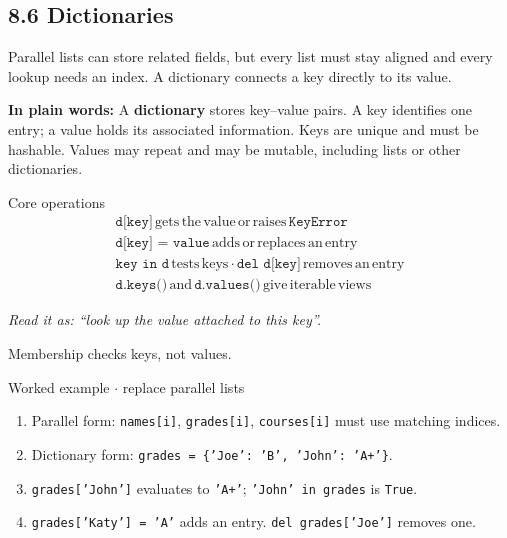 \documentclass[11pt]{article}
\begin{document}
\begin{keepsection}
\section{8.6 Dictionaries}

Parallel lists can store related fields, but every list must stay aligned and every lookup needs an index. A dictionary connects a key directly to its value.

\begin{plainbox}\textbf{In plain words:} A \textbf{dictionary} stores key–value pairs. A key identifies one entry; a value holds its associated information. Keys are unique and must be hashable. Values may repeat and may be mutable, including lists or other dictionaries.\end{plainbox}

\begin{equationcard}{Core operations}
\[ \begin{gathered} \texttt{d[key]}\, \text{gets}\, \text{the}\, \text{value}\, \text{or}\, \text{raises}\, \texttt{KeyError} \\ \texttt{d[key] = value}\, \text{adds}\, \text{or}\, \text{replaces}\, \text{an}\, \text{entry} \\ \texttt{key in d}\, \text{tests}\, \text{keys}\, \cdot \, \texttt{del d[key]}\, \text{removes}\, \text{an}\, \text{entry} \\ \texttt{d.keys()}\, \text{and}\, \texttt{d.values()}\, \text{give}\, \text{iterable}\, \text{views} \end{gathered} \]
{\small \emph{Read it as: “look up the value attached to this key”.}\par  Membership checks keys, not values.}
\end{equationcard}

\begin{workedbox}{Worked example \ensuremath{\cdot} replace parallel lists}
\begin{enumerate}
\item Parallel form: \texttt{names[i]}, \texttt{grades[i]}, \texttt{courses[i]} must use matching indices.
\item Dictionary form: \texttt{grades = \{'Joe': 'B', 'John': 'A+'\}}.
\item \texttt{grades['John']} evaluates to \texttt{'A+'}; \texttt{'John' in grades} is \texttt{True}.
\item \texttt{grades['Katy'] = 'A'} adds an entry. \texttt{del grades['Joe']} removes one.
\end{enumerate}
\end{workedbox}


\end{keepsection}
\end{document}
